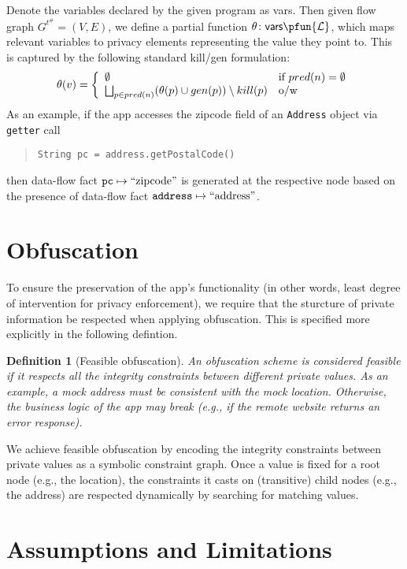 \documentclass[]{article}
\newtheorem{definition}{Definition}[section]
\begin{document}
Denote the variables declared by the given program as {\sf vars}. Then
given flow graph $G^{t^{\#}}=(V,E)$, we define a partial function $\theta \colon {\sf vars} \pfun {\cal L}$, which maps relevant variables to privacy elements representing the value they point to. This is captured by the following standard kill/gen formulation:
$$
\theta(v) = \left\{
\begin{array}{l l}
\emptyset & \textnormal{if $pred(n)=\emptyset$} \\
\bigsqcup_{p \in pred(n)} (\theta(p) \cup gen(p)) \setminus kill(p) & \textnormal{o/w}
\end{array} \right.
$$
As an example, if the app accesses the zipcode field of an {\tt Address} object via {\tt getter} call
\begin{quote}
	 {\tt String pc = address.getPostalCode()}
\end{quote}
then data-flow fact ${\tt pc} \mapsto \textnormal{``zipcode''}$ is generated at the respective node based on the presence of data-flow fact ${\tt address} \mapsto \textnormal{``address''}$.

\section{Obfuscation}

To ensure the preservation of the app's functionality (in other words, least degree of intervention for privacy enforcement), we
require that the sturcture of private information be respected when applying obfuscation. This is specified more explicitly in the following defintion.

\begin{definition}[Feasible obfuscation]
	An obfuscation scheme is considered \emph{feasible} if it respects all the integrity constraints between different private values. As an example, a mock address must be consistent with the mock location. Otherwise, the business logic of the app may break (e.g., if the remote website returns an error response).
\end{definition}

We achieve feasible obfuscation by encoding the integrity constraints between private values as a symbolic constraint graph. Once a value is fixed for a root node (e.g., the location), the constraints it casts on (transitive) child nodes (e.g., the address) are respected dynamically by searching for matching values.

\section{Assumptions and Limitations}
\end{document}
